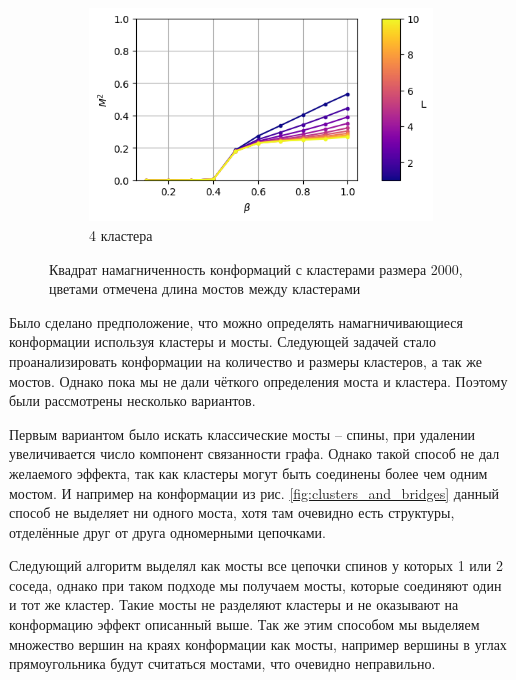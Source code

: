 \begin{figure}[ht]
\begin{subfigure}[t]{0.45\textwidth}
    \end{subfigure}
    \begin{subfigure}[t]{0.45\textwidth}
        \includegraphics*[width=\textwidth]{../images/magnetization_clusterized_W20_H50_N4.png}
        \caption*{4 кластера}
    \end{subfigure}
	\caption{Квадрат намагниченность конформаций с кластерами размера 2000, цветами отмечена длина мостов между кластерами}
	\label{fig:cluster_magnetization}
\end{figure}


Было сделано предположение, что можно определять намагничивающиеся конформации используя кластеры и мосты. Следующей задачей стало проанализировать конформации на количество и размеры кластеров, а так же мостов. Однако пока мы не дали чёткого определения моста и кластера. Поэтому были рассмотрены несколько вариантов.

Первым вариантом было искать классические мосты -- спины, при удалении увеличивается число компонент связанности графа. Однако такой способ не дал желаемого эффекта, так как кластеры могут быть соединены более чем одним мостом. И например на конформации из рис. \ref{fig:clusters_and_bridges} данный способ не выделяет ни одного моста, хотя там очевидно есть структуры, отделённые друг от друга одномерными цепочками. 

Следующий алгоритм выделял как мосты все цепочки спинов у которых 1 или 2 соседа, однако при таком подходе мы получаем мосты, которые соединяют один и тот же кластер. Такие мосты не разделяют кластеры и не оказывают на конформацию эффект описанный выше. Так же этим способом мы выделяем множество вершин на краях конформации как мосты, например вершины в углах прямоугольника будут считаться мостами, что очевидно неправильно.

